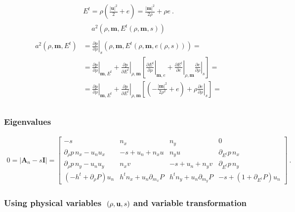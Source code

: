 \documentclass[letterpaper,10pt,english]{jupyterBook}
\begin{document}
\begin{equation*}
\begin{split}E^t = \rho \left( \frac{|\mathbf{u}|^2}{2} + e \right) = \frac{|\mathbf{m}|^2}{2 \rho} + \rho e \ .\end{split}
\end{equation*}\begin{equation*}
\begin{split}\begin{aligned}
  a^2(\rho, \mathbf{m}, E^t(\rho, \mathbf{m}, s))
\end{aligned}\end{split}
\end{equation*}\begin{equation*}
\begin{split}\begin{aligned}
a^2(\rho,\mathbf{m}, E^t)
  & = \left.\frac{\partial p}{\partial \rho}\right|_{s} (\rho, \mathbf{m}, E^t(\rho, \mathbf{m}, e(\rho, s))) = \\
  & = \left.\frac{\partial p}{\partial \rho}\right|_{\mathbf{m}, E^t} + \left.\frac{\partial p}{\partial E^t}\right|_{\rho, \mathbf{m}} \left[ \left.\frac{\partial E^t}{\partial \rho}\right|_{\mathbf{m}, e} + \left.\frac{\partial E^t}{\partial e} \right|_{\rho, \mathbf{m}} \left.\frac{\partial e}{\partial \rho}\right|_{s} \right]  = \\
  & = \left.\frac{\partial p}{\partial \rho}\right|_{\mathbf{m}, E^t} + \left.\frac{\partial p}{\partial E^t}\right|_{\rho, \mathbf{m}} \left[ \left( - \frac{|\mathbf{m}|^2}{2 \rho^2} + e \right) + \rho \left.\frac{\partial e}{\partial \rho}\right|_{s} \right]  = \\
\end{aligned}\end{split}
\end{equation*}\subsubsection*{Eigenvalues}
\begin{equation*}
\begin{split}
0 = |\mathbf{A}_n - s \mathbf{I}| =
\begin{bmatrix}
  -s & n_x & n_y & 0 \\
  \partial_\rho p \, n_x - u_n u_x & -s + u_n + n_x u &       n_y u & \partial_{E^t} p \, n_x \\
  \partial_\rho p \, n_y - u_n u_y &       n_x v & -s + u_n + n_y v & \partial_{E^t} p \, n_y \\
  ( - h^t + \partial_\rho P ) u_n & h^t n_x + u_n \partial_{m_x} P & h^t n_y + u_n \partial_{m_y} P & -s + \left( 1 + \partial_{E^t} P \right) u_n
\end{bmatrix} \ .
\end{split}
\end{equation*}\subsubsection*{Using physical variables \protect\(\ (\rho, \mathbf{u}, s)\protect\) and variable transformation}
\end{document}
